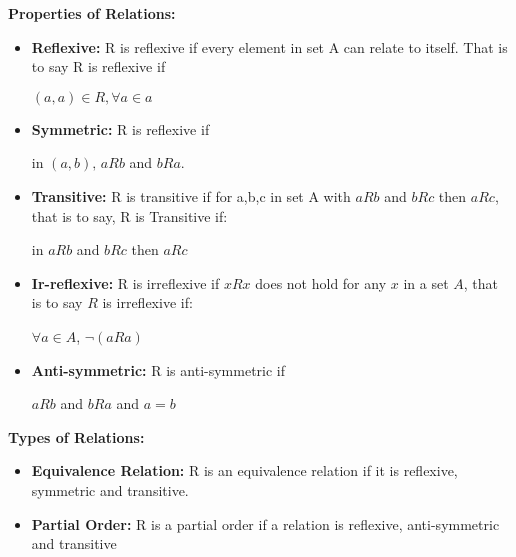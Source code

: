 \documentclass{article}
\begin{document}
\begin{flushleft}
\textbf{Properties of Relations:} 
\end{flushleft}
\begin{itemize}
  \item \textbf{Reflexive:} R is reflexive if every element in set A can relate to itself. That is to say R is reflexive if 
  \begin{center}
$(a,a) \in R, \forall a \in a$
\end{center}
  \item \textbf{Symmetric:} R is reflexive if 
 \begin{center} in $(a,b), \, aRb$ and $bRa$. \end{center}
  \item \textbf{Transitive:} R is transitive if for a,b,c in set A with $aRb$ and $bRc$ then $aRc$, that is to say, R is Transitive if:
  \begin{center} in $aRb$ and $bRc$ then $aRc$ \end{center}
  \item \textbf{Ir-reflexive:}  R is irreflexive if $xRx$ does not hold for any $x$ in a set $A$, that is to say $R$ is irreflexive if:
  \begin{center} $\forall a \in A$,  $\neg (aRa)$ \end{center}
  
  \item \textbf{Anti-symmetric:} R is anti-symmetric if 
   \begin{center} $aRb$ and $bRa$ and $a=b$ \end{center}
\end{itemize}
\begin{flushleft}
\textbf{Types of Relations:} 
\end{flushleft}
\begin{itemize}
  \item \textbf{Equivalence Relation:} R is an equivalence relation if it is reflexive, symmetric and transitive.
  \item \textbf{Partial Order:}  R is a partial order if a relation is reflexive, anti-symmetric and transitive
\end{itemize}
\end{document}

